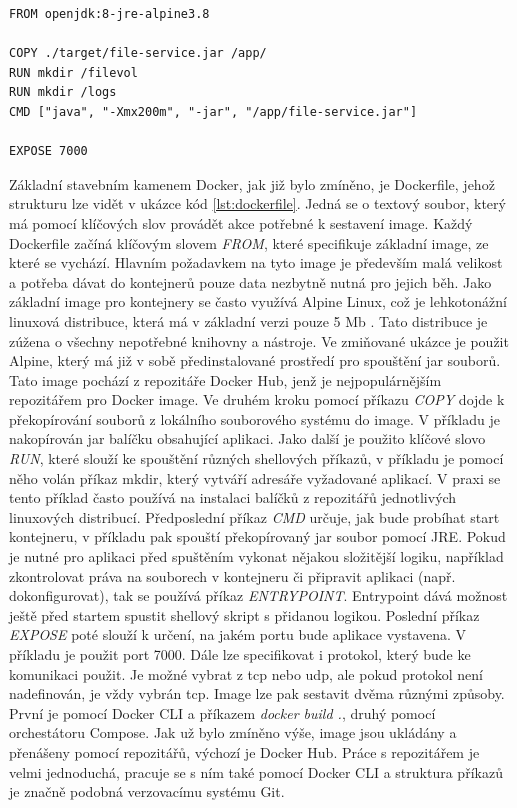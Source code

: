 \begin{lstlisting}[caption={Dockerfile, zdroj: vlastní tvorba},label={lst:dockerfile}]
FROM openjdk:8-jre-alpine3.8

COPY ./target/file-service.jar /app/
RUN mkdir /filevol
RUN mkdir /logs
CMD ["java", "-Xmx200m", "-jar", "/app/file-service.jar"]

EXPOSE 7000
\end{lstlisting}

Základní stavebním kamenem Docker, jak již bylo zmíněno, je Dockerfile, jehož strukturu lze vidět v ukázce kód \ref{lst:dockerfile}. Jedná se o textový soubor, který má pomocí klíčových slov provádět akce potřebné k sestavení image. Každý Dockerfile začíná klíčovým slovem \textit{FROM}, které specifikuje základní image, ze které se vychází. Hlavním požadavkem na tyto image je především malá velikost a potřeba dávat do kontejnerů pouze data nezbytně nutná pro jejich běh. Jako základní image pro kontejnery se často využívá Alpine Linux, což je lehkotonážní linuxová distribuce, která má v základní verzi pouze 5 Mb \cite{docker_alpine}. Tato distribuce je zúžena o všechny nepotřebné knihovny a nástroje. Ve zmiňované ukázce je použit Alpine, který má již v sobě předinstalované prostředí pro spouštění jar souborů. Tato image pochází z repozitáře Docker Hub, jenž je nejpopulárnějším repozitářem pro Docker image. Ve druhém kroku pomocí příkazu \textit{COPY} dojde k překopírování souborů z lokálního souborového systému do image. V příkladu je nakopírován jar balíčku obsahující aplikaci. Jako další je použito klíčové slovo \textit{RUN}, které slouží ke spouštění různých shellových příkazů, v příkladu je pomocí něho volán příkaz mkdir, který vytváří adresáře vyžadované aplikací. V praxi se tento příklad často používá na instalaci balíčků z repozitářů jednotlivých linuxových distribucí. Předposlední příkaz \textit{CMD} určuje, jak bude probíhat start kontejneru, v příkladu pak spouští překopírovaný jar soubor pomocí JRE. Pokud je nutné pro aplikaci před spuštěním vykonat nějakou složitější logiku, například zkontrolovat práva na souborech v kontejneru či připravit aplikaci (např. dokonfigurovat), tak se používá příkaz \textit{ENTRYPOINT}. Entrypoint dává možnost ještě před startem spustit shellový skript s přidanou logikou. Poslední příkaz \textit{EXPOSE} poté slouží k určení, na jakém portu bude aplikace vystavena. V příkladu je použit port 7000. Dále lze specifikovat i protokol, který bude ke komunikaci použit. Je možné vybrat z tcp nebo udp, ale pokud protokol není nadefinován, je vždy vybrán tcp. Image lze pak sestavit dvěma různými způsoby. První je pomocí Docker CLI a příkazem \textit{docker build .}, druhý pomocí orchestátoru Compose. Jak už bylo zmíněno výše, image jsou ukládány a přenášeny pomocí repozitářů, výchozí je Docker Hub. Práce s repozitářem je velmi jednoduchá, pracuje se s ním také pomocí Docker CLI a struktura příkazů je značně podobná verzovacímu systému Git.

